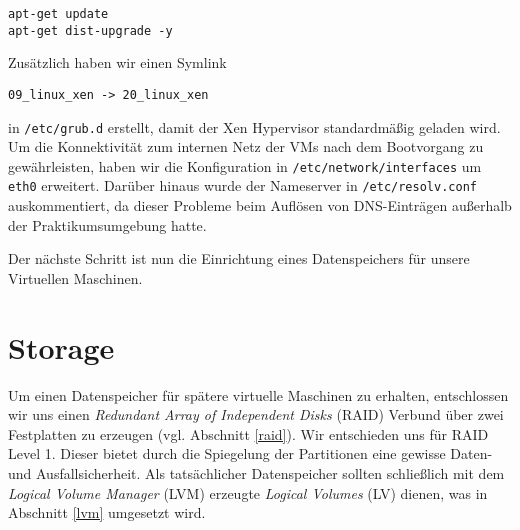 \begin{verbatim}
apt-get update
apt-get dist-upgrade -y
\end{verbatim}
Zusätzlich haben wir einen Symlink 
\setupVerbatimOut 
\begin{verbatim} 
09_linux_xen -> 20_linux_xen 
\end{verbatim} 
in \verb#/etc/grub.d# erstellt, damit der Xen Hypervisor standardmäßig geladen wird.
\\
Um die Konnektivität zum internen Netz der VMs nach dem Bootvorgang zu gewährleisten, haben wir die Konfiguration in \verb#/etc/network/interfaces# um \verb#eth0# erweitert. Darüber hinaus wurde der Nameserver in \verb#/etc/resolv.conf# auskommentiert, da dieser Probleme beim Auflösen von DNS-Einträgen außerhalb der Praktikumsumgebung hatte.

Der nächste Schritt ist nun die Einrichtung eines Datenspeichers für unsere Virtuellen Maschinen.

\chapter{Storage}\label{chap:stor}
Um einen Datenspeicher für spätere virtuelle Maschinen zu erhalten, entschlossen wir uns einen \emph{Redundant Array of Independent Disks} (RAID) Verbund über zwei Festplatten zu erzeugen (vgl. Abschnitt \ref{raid}). Wir entschieden uns für RAID Level 1. Dieser bietet durch die Spiegelung der Partitionen eine gewisse Daten- und Ausfallsicherheit. Als tatsächlicher Datenspeicher sollten schließlich mit dem \emph{Logical Volume Manager} (LVM) erzeugte \emph{Logical Volumes} (LV) dienen, was in Abschnitt \ref{lvm} umgesetzt wird.
